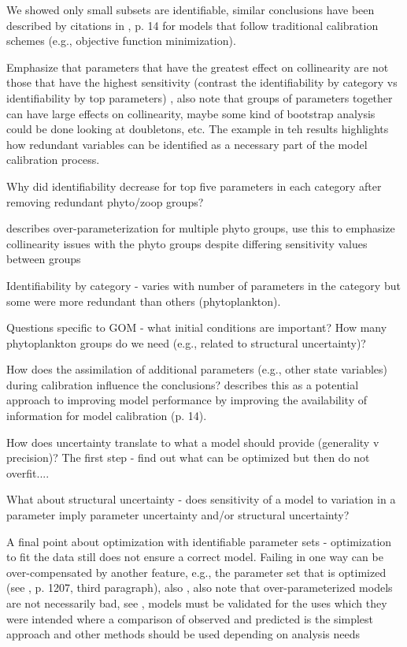 \documentclass[letterpaper,12pt,oneside]{article}\usepackage[]{graphicx}\usepackage[]{color}
\begin{document}
We showed only small subsets are identifiable, similar conclusions have been described by citations in \citep{Wagener01}, p. 14 for models that follow traditional calibration schemes (e.g., objective function minimization).

Emphasize that parameters that have the greatest effect on collinearity are not those that have the highest sensitivity (contrast the identifiability by category vs identifiability by top parameters)  , also note that groups of parameters together can have large effects on collinearity, maybe some kind of bootstrap analysis could be done looking at doubletons, etc. The example in teh results highlights how redundant variables can be identified as a necessary part of the model calibration process.

Why did identifiability decrease for top five parameters in each category after removing redundant phyto/zoop groups?

\citep{Denman03} describes over-parameterization for multiple phyto groups, use this to emphasize collinearity issues with the phyto groups despite differing sensitivity values between groups

Identifiability by category - varies with number of parameters in the category but some were more redundant than others (phytoplankton).  

Questions specific to GOM - what initial conditions are important? How many phytoplankton groups do we need (e.g., related to structural uncertainty)?

How does the assimilation of additional parameters (e.g., other state variables) during calibration influence the conclusions?  \citet{Wagener01} describes this as a potential approach to improving model performance by improving the availability of information for model calibration (p. 14).  

How does uncertainty translate to what a model should provide (generality v precision)?  The first step - find out what can be optimized but then do not overfit....

What about structural uncertainty - does sensitivity of a model to variation in a parameter imply parameter uncertainty and/or structural uncertainty?

A final point about optimization with identifiable parameter sets - optimization to fit the data still does not ensure a correct model.  Failing in one way can be over-compensated by another feature, e.g., the parameter set that is optimized (see \cite{Flynn05}, p. 1207, third paragraph), also \citep{Durand02,Arhonditsis08}, also note that over-parameterized models are not necessarily bad, see \citep{Omlin01}, models must be validated for the uses which they were intended where a comparison of observed and predicted is the simplest approach and other methods should be used depending on analysis needs \citep{Rykiel96}
\end{document}
